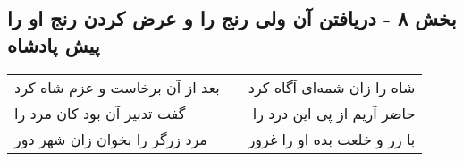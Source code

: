 \begin{center}
\section*{بخش ۸ - دریافتن آن ولی رنج را و عرض کردن رنج او را پیش پادشاه}
\label{sec:sh008}
\begin{longtable}{l p{0.5cm} r}
بعد از آن برخاست و عزم شاه کرد
&&
شاه را زان شمه‌ای آگاه کرد
\\
گفت تدبیر آن بود کان مرد را
&&
حاضر آریم از پی این درد را
\\
مرد زرگر را بخوان زان شهر دور
&&
با زر و خلعت بده او را غرور
\\
\end{longtable}
\end{center}
